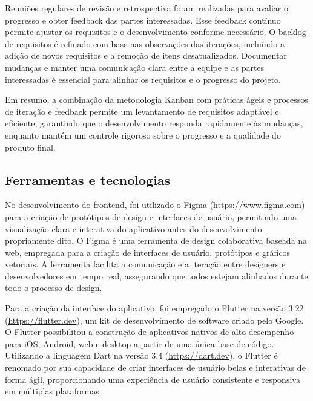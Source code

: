Reuniões regulares de revisão e retrospectiva foram realizadas para avaliar o progresso e obter feedback das partes interessadas. Esse feedback contínuo permite ajustar os requisitos e o desenvolvimento conforme necessário. O backlog de requisitos é refinado com base nas observações das iterações, incluindo a adição de novos requisitos e a remoção de itens desatualizados. Documentar mudanças e manter uma comunicação clara entre a equipe e as partes interessadas é essencial para alinhar os requisitos e o progresso do projeto.

Em resumo, a combinação da metodologia Kanban com práticas ágeis e processos de iteração e feedback permite um levantamento de requisitos adaptável e eficiente, garantindo que o desenvolvimento responda rapidamente às mudanças, enquanto mantém um controle rigoroso sobre o progresso e a qualidade do produto final.

\subsection{Ferramentas e tecnologias}


No desenvolvimento do frontend, foi utilizado o Figma (\url{https://www.figma.com}) para a criação de protótipos de design e interfaces de usuário, permitindo uma visualização clara e interativa do aplicativo antes do desenvolvimento propriamente dito. O Figma é uma ferramenta de design colaborativa baseada na web, empregada para a criação de interfaces de usuário, protótipos e gráficos vetoriais. A ferramenta facilita a comunicação e a iteração entre designers e desenvolvedores em tempo real, assegurando que todos estejam alinhados durante todo o processo de design.

Para a criação da interface do aplicativo, foi empregado o Flutter na versão 3.22 (\url{https://flutter.dev}), um kit de desenvolvimento de software criado pelo Google. O Flutter possibilitou a construção de aplicativos nativos de alto desempenho para iOS, Android, web e desktop a partir de uma única base de código. Utilizando a linguagem Dart na versão 3.4 (\url{https://dart.dev}), o Flutter é renomado por sua capacidade de criar interfaces de usuário belas e interativas de forma ágil, proporcionando uma experiência de usuário consistente e responsiva em múltiplas plataformas.

